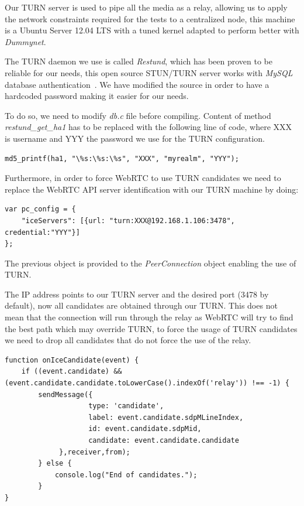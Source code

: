 Our TURN server is used to pipe all the media as a relay, allowing us to apply the network constraints required for the tests to a centralized node, this machine is a Ubuntu Server 12.04 LTS with a tuned kernel adapted to perform better with {\it Dummynet}.

The TURN daemon we use is called {\it Restund}, which has been proven to be reliable for our needs, this open source STUN/TURN server works with {\it MySQL} database authentication~\cite{restund}. We have modified the source in order to have a hardcoded password making it easier for our needs.

To do so, we need to modify {\it db.c} file before compiling. Content of  method {\it restund\_get\_ha1} has to be replaced with the following line of code, where XXX is username and YYY the password we use for the TURN configuration.

\lstset{language=C}
\begin{lstlisting}[caption=Forcing a hardcoded password in our TURN server]
md5_printf(ha1, "\%s:\%s:\%s", "XXX", "myrealm", "YYY");
\end{lstlisting}

Furthermore, in order to force WebRTC to use TURN candidates we need to replace the WebRTC API server identification with our TURN machine by doing:

\lstset{language=JavaScript}
\begin{lstlisting}[caption=Configuring our TURN server in WebRTC]
var pc_config = {
	"iceServers": [{url: "turn:XXX@192.168.1.106:3478", credential:"YYY"}]
};
\end{lstlisting}

The previous object is provided to the {\it PeerConnection} object enabling the use of TURN.

The IP address points to our TURN server and the desired port (3478 by default), now all candidates are obtained through our TURN. This does not mean that the connection will run through the relay as WebRTC will try to find the best path which may override TURN, to force the usage of TURN candidates we need to drop all candidates that do not force the use of the relay.

\lstset{language=JavaScript}
\begin{lstlisting}[caption=Dropping all candidates except relay]
function onIceCandidate(event) {
	if ((event.candidate) && (event.candidate.candidate.toLowerCase().indexOf('relay')) !== -1) {
		sendMessage({
               		type: 'candidate',
               		label: event.candidate.sdpMLineIndex,
               		id: event.candidate.sdpMid,
               		candidate: event.candidate.candidate
          	 },receiver,from);
       	} else {
           	console.log("End of candidates.");
       	}
}
\end{lstlisting}

